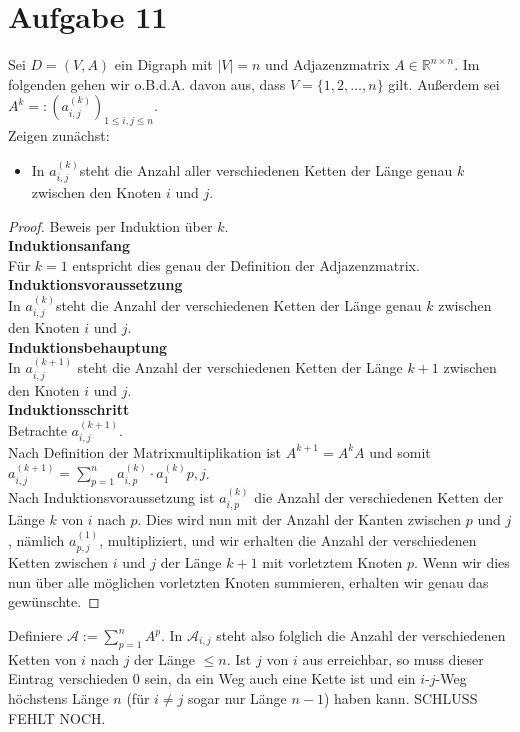 \documentclass[a4paper,10pt,german]{scrartcl}
\newcommand{\R}{\ensuremath{\mathbb{R}}}
\newcommand{\ad}[2][k]{\ensuremath{a^{(#1)}_{#2}}}
\newcommand{\aij}[1][k]{\ad[#1]{i,j}}
\begin{document}
\section*{Aufgabe 11}
Sei $D=(V,A)$ ein Digraph mit $|V|=n$ und Adjazenzmatrix $A\in\R^{n\times n}$. Im folgenden gehen wir o.B.d.A. davon aus, dass $V=\{1,2,\dots,n\}$ gilt. Außerdem sei $A^k=:\left(\aij\right)_{1\leq i,j\leq n}$.\\
Zeigen zunächst: \begin{itemize}
                 \item[] In \aij steht die Anzahl aller verschiedenen Ketten der Länge genau $k$ zwischen den Knoten $i$ und $j$.
                 \end{itemize}
\begin{proof}
  Beweis per Induktion über $k$.\\
  {\bf Induktionsanfang}\\
  Für $k=1$ entspricht dies genau der Definition der Adjazenzmatrix.\\
  {\bf Induktionsvoraussetzung}\\
  In \aij steht die Anzahl der verschiedenen Ketten der Länge genau $k$ zwischen den Knoten $i$ und $j$.\\
  {\bf Induktionsbehauptung}\\
  In \aij[k+1] steht die Anzahl der verschiedenen Ketten der Länge $k+1$ zwischen den Knoten $i$ und $j$.\\
  {\bf Induktionsschritt}\\
  Betrachte \aij[k+1].\\
  Nach Definition der Matrixmultiplikation ist $A^{k+1}=A^kA$ und somit $\aij[k+1]=\sum\limits_{p=1}^n\ad{i,p}\cdot \ad1{p,j}$.\\
  Nach Induktionsvoraussetzung ist \ad{i,p} die Anzahl der verschiedenen Ketten der Länge $k$ von $i$ nach $p$. Dies wird nun mit der Anzahl der Kanten zwischen $p$ und $j$, nämlich \ad[1]{p,j}, multipliziert, und wir erhalten die Anzahl der verschiedenen Ketten zwischen $i$ und $j$ der Länge $k+1$ mit vorletztem Knoten $p$. Wenn wir dies nun über alle möglichen vorletzten Knoten summieren, erhalten wir genau das gewünschte.
\end{proof}
Definiere $\mathcal{A}:=\sum_{p=1}^nA^p$. In $\mathcal{A}_{i,j}$ steht also folglich die Anzahl der verschiedenen Ketten von $i$ nach $j$ der Länge $\leq n$. Ist $j$ von $i$ aus erreichbar, so muss dieser Eintrag verschieden 0 sein, da ein Weg auch eine Kette ist und ein $i$-$j$-Weg höchstens Länge $n$ (für $i\neq j$ sogar nur Länge $n-1$) haben kann.
SCHLUSS FEHLT NOCH.
\end{document}
